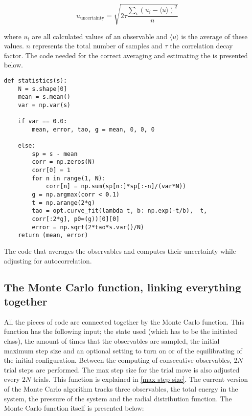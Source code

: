 \begin{equation}
	u_\text{uncertainty} = \sqrt{2\tau \frac{ \sum_i(u_i - \langle u\rangle)^2}{n}}
\end{equation}

where $u_i$ are all calculated values of an observable and $\langle u\rangle$ is the average of these values. $n$ represents the total number of samples and $\tau$ the correlation decay factor. The code needed for the correct averaging and estimating the is presented below.

\begin{listing}[ht!]
	\begin{verbatim}
def statistics(s):
	N = s.shape[0]
	mean = s.mean()
	var = np.var(s)

	if var == 0.0:
		mean, error, tao, g = mean, 0, 0, 0

	else:
		sp = s - mean
		corr = np.zeros(N)
		corr[0] = 1
		for n in range(1, N):
			corr[n] = np.sum(sp[n:]*sp[:-n]/(var*N))
		g = np.argmax(corr < 0.1)
		t = np.arange(2*g)
		tao = opt.curve_fit(lambda t, b: np.exp(-t/b),  t,
		corr[:2*g], p0=(g))[0][0]
		error = np.sqrt(2*tao*s.var()/N)
	return (mean, error)
	\end{verbatim}
	\caption{The code that averages the observables and computes their uncertainty while adjusting for autocorrelation.}
	\label{Statistical assesment}
\end{listing}

\subsection{The Monte Carlo function, linking everything together}
All the pieces of code are connected together by the Monte Carlo function. This function has the following input; the state used (which has to be the initiated class), the amount of times that the observables are sampled, the initial maximum step size and an optional setting to turn on or of the equilibrating of the initial configuration. Between the computing of consecutive observables, $2N$ trial steps are performed. The max step size for the trial move is also adjusted every $2N$ trials. This function is explained in \cref{max step size}. The current version of the Monte Carlo algorithm tracks three observables, the total energy in the system, the pressure of the system and the radial distribution function. The Monte Carlo function itself is presented below:

